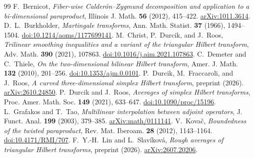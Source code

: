 \documentclass[11pt]{article}
\begin{document}
\begin{thebibliography}{99}
F.~Bernicot, \emph{Fiber-wise Calder\'on--Zygmund decomposition and
application to a bi-dimensional paraproduct},
Illinois J. Math. \textbf{56} (2012), 415--422.
\href{https://arxiv.org/abs/1011.3614}{arXiv:1011.3614}.
D.~L.~Burkholder, \emph{Martingale transforms},
Ann. Math. Statist. \textbf{37} (1966), 1494--1504.
\href{https://doi.org/10.1214/aoms/1177699141}{doi:10.1214/aoms/1177699141}.
M.~Christ, P.~Durcik, and J.~Roos,
\emph{Trilinear smoothing inequalities and a variant of the triangular
Hilbert transform}, Adv. Math. \textbf{390} (2021), 107863.
\href{https://doi.org/10.1016/j.aim.2021.107863}{doi:10.1016/j.aim.2021.107863}.
C.~Demeter and C.~Thiele,
\emph{On the two-dimensional bilinear Hilbert transform},
Amer. J. Math. \textbf{132} (2010), 201--256.
\href{https://doi.org/10.1353/ajm.0.0101}{doi:10.1353/ajm.0.0101}.
P.~Durcik, M.~Fraccaroli, and J.~Roos,
\emph{A curved three-dimensional simplex Hilbert transform},
preprint (2026). \href{https://arxiv.org/abs/2610.24850}{arXiv:2610.24850}.
P.~Durcik and J.~Roos,
\emph{Averages of simplex Hilbert transforms},
Proc. Amer. Math. Soc. \textbf{149} (2021), 633--647.
\href{https://doi.org/10.1090/proc/15196}{doi:10.1090/proc/15196}.
L.~Grafakos and T.~Tao,
\emph{Multilinear interpolation between adjoint operators},
J. Funct. Anal. \textbf{199} (2003), 379--385.
\href{https://arxiv.org/abs/math/0111141}{arXiv:math/0111141}.
V.~Kova\v{c}, \emph{Boundedness of the twisted paraproduct},
Rev. Mat. Iberoam. \textbf{28} (2012), 1143--1164.
\href{https://doi.org/10.4171/RMI/707}{doi:10.4171/RMI/707}.
F.~Y.-H.~Lin and L.~Slav\'ikov\'a,
\emph{Rough averages of triangular Hilbert transforms},
preprint (2026). \href{https://arxiv.org/abs/2607.20206}{arXiv:2607.20206}.
\end{thebibliography}
\end{document}
